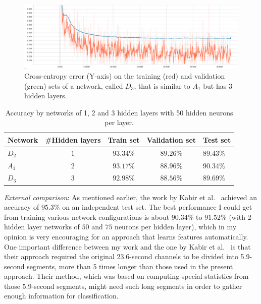 \documentclass[12pt]{article}
\begin{document}
\begin{figure}
  \includegraphics[width=\linewidth]{figures/stack_50_50_50_dropout_elu/learning_curves.eps}
  \caption{Cross-entropy error (Y-axis) on the training (red) and validation (green) sets of a network, called $D_3$, that is similar to $A_1$ but has 3 hidden layers.}
  \label{fig:stack_50_50_50}
\end{figure}

\begin{table}
\begin{center}
\begin{tabular}{|l||c|c|c|l|}
\hline
Network & \#Hidden layers & Train set & Validation set & Test set\\ \hline \hline
$D_2$ & $1$ & $93.34\%$ & $89.26\%$ & $89.43\%$\\ \hline
$A_1$ & $2$ & $93.17\%$ & $88.96\%$ & $90.34\%$ \\ \hline
$D_3$ & $3$ & $92.98\%$ & $88.56\%$ & $89.69\%$\\ \hline
\end{tabular}
\caption{Accuracy by networks of 1, 2 and 3 hidden layers with 50 hidden neurons per layer.}
\label{tab:stack_50_50_50}
\end{center}
\end{table}

\vspace{5mm}
\noindent
\textit{External comparison}: As mentioned earlier, the work by Kabir et al.~\cite{kabir2016epileptic} achieved an accuracy of $95.3\%$ on an independent test set. The best performance I could get from training various network configurations is about $90.34\%$ to $91.52\%$ (with 2-hidden layer networks of $50$ and $75$ neurons per hidden layer), which in my opinion is very encouraging for an approach that learns features automatically. One important difference between my work and the one by Kabir et al.~\cite{kabir2016epileptic} is that their approach required the original 23.6-second channels to be divided into 5.9-second segments, more than 5 times longer than those used in the present approach. Their method, which was based on computing special statistics from those 5.9-second segments, might need such long segments in order to gather enough information for classification.
\end{document}
